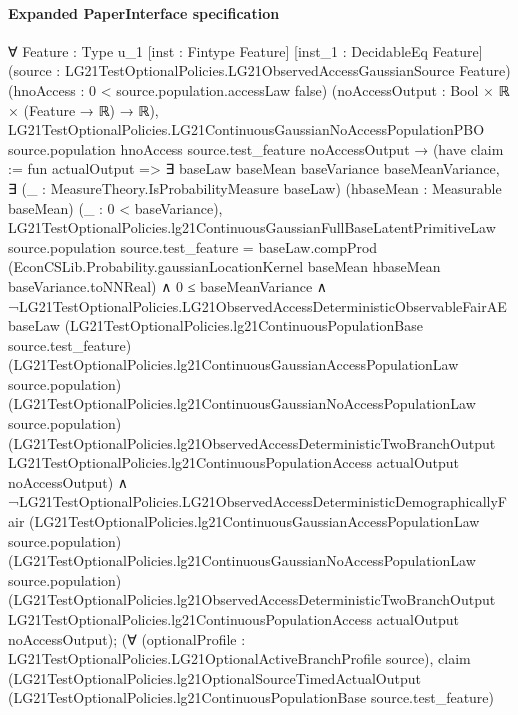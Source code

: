 \documentclass[10pt]{article}
\begin{document}
\paragraph{Expanded PaperInterface specification}
\begin{ReviewVerbatim}
∀ {Feature : Type u_1} [inst : Fintype Feature] [inst_1 : DecidableEq Feature]
  (source : LG21TestOptionalPolicies.LG21ObservedAccessGaussianSource Feature)
  (hnoAccess : 0 < source.population.accessLaw {false}) (noAccessOutput : Bool × ℝ × (Feature → ℝ) → ℝ),
  LG21TestOptionalPolicies.LG21ContinuousGaussianNoAccessPopulationPBO source.population hnoAccess source.test_feature
      noAccessOutput →
    (have claim := fun actualOutput =>
        ∃ baseLaw baseMean baseVariance baseMeanVariance,
          ∃ (_ : MeasureTheory.IsProbabilityMeasure baseLaw) (hbaseMean : Measurable baseMean) (_ : 0 < baseVariance),
            LG21TestOptionalPolicies.lg21ContinuousGaussianFullBaseLatentPrimitiveLaw source.population
                  source.test_feature =
                baseLaw.compProd
                  (EconCSLib.Probability.gaussianLocationKernel baseMean hbaseMean baseVariance.toNNReal) ∧
              0 ≤ baseMeanVariance ∧
                ¬LG21TestOptionalPolicies.LG21ObservedAccessDeterministicObservableFairAE baseLaw
                      (LG21TestOptionalPolicies.lg21ContinuousPopulationBase source.test_feature)
                      (LG21TestOptionalPolicies.lg21ContinuousGaussianAccessPopulationLaw source.population)
                      (LG21TestOptionalPolicies.lg21ContinuousGaussianNoAccessPopulationLaw source.population)
                      (LG21TestOptionalPolicies.lg21ObservedAccessDeterministicTwoBranchOutput
                        LG21TestOptionalPolicies.lg21ContinuousPopulationAccess actualOutput noAccessOutput) ∧
                  ¬LG21TestOptionalPolicies.LG21ObservedAccessDeterministicDemographicallyFair
                      (LG21TestOptionalPolicies.lg21ContinuousGaussianAccessPopulationLaw source.population)
                      (LG21TestOptionalPolicies.lg21ContinuousGaussianNoAccessPopulationLaw source.population)
                      (LG21TestOptionalPolicies.lg21ObservedAccessDeterministicTwoBranchOutput
                        LG21TestOptionalPolicies.lg21ContinuousPopulationAccess actualOutput noAccessOutput);
      (∀ (optionalProfile : LG21TestOptionalPolicies.LG21OptionalActiveBranchProfile source),
          claim
            (LG21TestOptionalPolicies.lg21OptionalSourceTimedActualOutput
              (LG21TestOptionalPolicies.lg21ContinuousPopulationBase source.test_feature)

\end{ReviewVerbatim}
\end{document}
